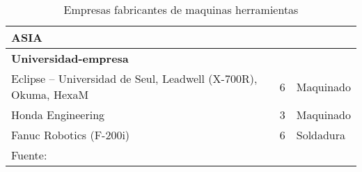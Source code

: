 \begin{longtable}[c]{m{} m{} m{}}
    \hline \rowcolor[gray]{0.9} \textbf{ASIA} & & \\ \hline
    \textbf{Universidad-empresa} & & \\
    Eclipse – Universidad de Seul, Leadwell (X-700R), Okuma, HexaM & 6 & Maquinado \\
    Honda Engineering       & 3 & Maquinado \\
    Fanuc Robotics (F-200i) & 6 & Soldadura \\ \hline
    \caption{Empresas fabricantes de maquinas herramientas}{Fuente: \citep{serje2017parallel}}
\end{longtable}